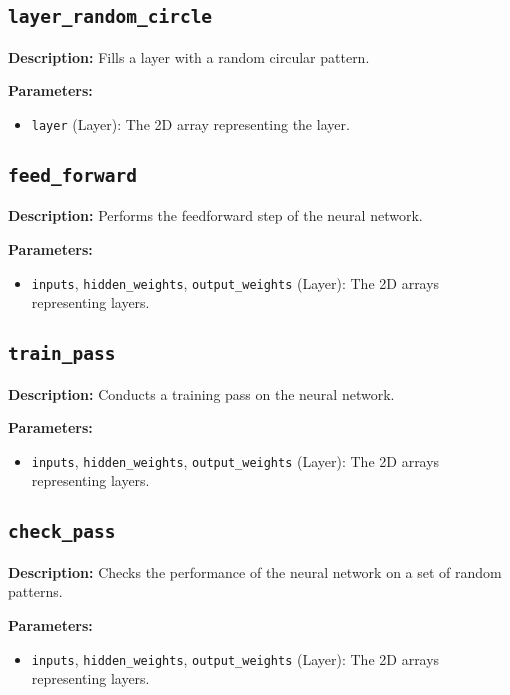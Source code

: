 \documentclass{article}
\begin{document}
\subsection*{\texttt{layer\_random\_circle}}

\textbf{Description:} Fills a layer with a random circular pattern.

\textbf{Parameters:}
\begin{itemize}
    \item \texttt{layer} (Layer): The 2D array representing the layer.
\end{itemize}

\subsection*{\texttt{feed\_forward}}

\textbf{Description:} Performs the feedforward step of the neural network.

\textbf{Parameters:}
\begin{itemize}
    \item \texttt{inputs}, \texttt{hidden\_weights}, \texttt{output\_weights} (Layer): The 2D arrays representing layers.
\end{itemize}

\subsection*{\texttt{train\_pass}}

\textbf{Description:} Conducts a training pass on the neural network.

\textbf{Parameters:}
\begin{itemize}
    \item \texttt{inputs}, \texttt{hidden\_weights}, \texttt{output\_weights} (Layer): The 2D arrays representing layers.
\end{itemize}

\subsection*{\texttt{check\_pass}}

\textbf{Description:} Checks the performance of the neural network on a set of random patterns.

\textbf{Parameters:}
\begin{itemize}
    \item \texttt{inputs}, \texttt{hidden\_weights}, \texttt{output\_weights} (Layer): The 2D arrays representing layers.
\end{itemize}
\end{document}
